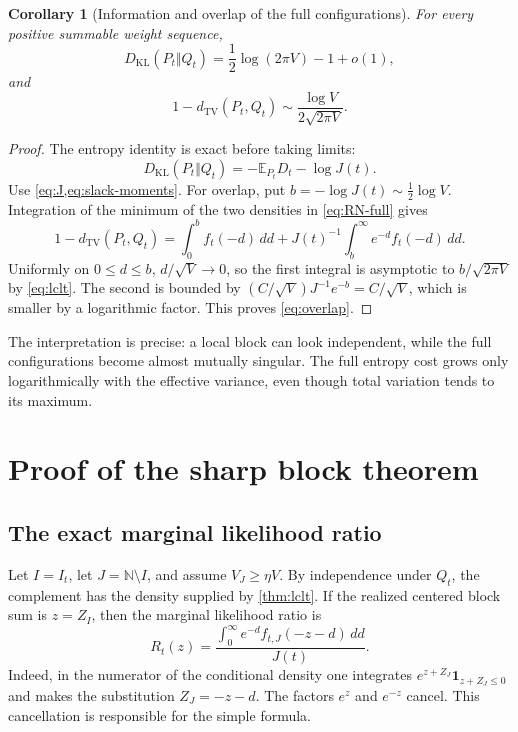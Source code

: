 \documentclass[11pt,a4paper]{article}
\numberwithin{equation}{section}
\newtheorem{corollary}[corollary]{Corollary}
\theoremstyle{definition}
\theoremstyle{remark}
\newcommand{\N}{\mathbb N}
\newcommand{\E}{\mathbb E}
\newcommand{\Qt}{Q_t}
\newcommand{\Pt}{P_t}
\newcommand{\TV}{d_{\mathrm{TV}}}
\newcommand{\KL}{D_{\mathrm{KL}}}
\newcommand{\ind}{\mathbf 1}
\begin{document}
\begin{corollary}[Information and overlap of the full configurations]
\label{cor:full-info}
For every positive summable weight sequence,
\begin{equation}\label{eq:full-kl}
 \KL(\Pt\Vert\Qt)=\frac12\log(2\pi V)-1+o(1),
\end{equation}
and
\begin{equation}\label{eq:overlap}
 1-\TV(\Pt,\Qt)
 \sim\frac{\log V}{2\sqrt{2\pi V}}.
\end{equation}
\end{corollary}
\begin{proof}
The entropy identity is exact before taking limits:
\[
 \KL(\Pt\Vert\Qt)=-\E_{\Pt}D_t-\log J(t).
\]
Use \cref{eq:J,eq:slack-moments}. For overlap, put
$b=-\log J(t)\sim\tfrac12\log V$. Integration of the minimum of the
two densities in \cref{eq:RN-full} gives
\begin{equation}\label{eq:overlap-exact}
 1-\TV(\Pt,\Qt)=\int_0^b f_t(-d)\,dd
       +J(t)^{-1}\int_b^\infty e^{-d}f_t(-d)\,dd.
\end{equation}
Uniformly on $0\le d\le b$, $d/\sqrt V\to0$, so the first integral
is asymptotic to $b/\sqrt{2\pi V}$ by \cref{eq:lclt}. The second
is bounded by $(C/\sqrt V)J^{-1}e^{-b}=C/\sqrt V$, which is
smaller by a logarithmic factor. This proves \cref{eq:overlap}.
\end{proof}

The interpretation is precise: a local block can look independent,
while the full configurations become almost mutually singular.
The full entropy cost grows only logarithmically with the effective
variance, even though total variation tends to its maximum.

\section{Proof of the sharp block theorem}
\label{sec:block-proof}

\subsection{The exact marginal likelihood ratio}
Let $I=I_t$, let $J=\N\setminus I$, and assume $V_J\ge\eta V$.
By independence under $\Qt$, the complement has the density supplied
by \cref{thm:lclt}. If the realized centered block sum is $z=Z_I$,
then the marginal likelihood ratio is
\begin{equation}\label{eq:block-ratio}
 R_t(z)=\frac{\int_0^\infty e^{-d}f_{t,J}(-z-d)\,dd}{J(t)}.
\end{equation}
Indeed, in the numerator of the conditional density one integrates
$e^{z+Z_J}\ind_{z+Z_J\le0}$ and makes the substitution
$Z_J=-z-d$. The factors $e^z$ and $e^{-z}$ cancel. This cancellation
is responsible for the simple formula.
\end{document}
